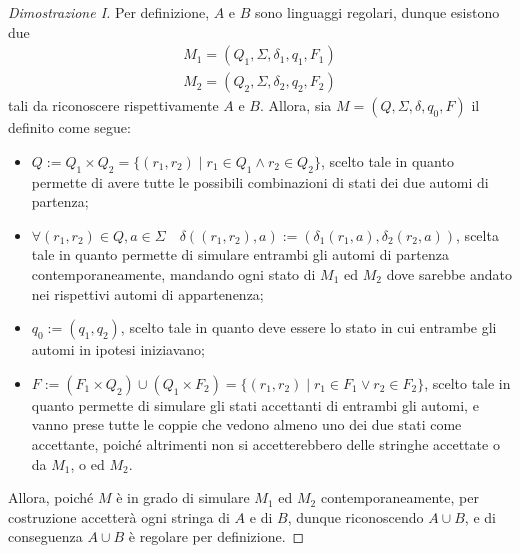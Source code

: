 \documentclass[a4paper, 12pt]{report}
\begin{document}
    \begin{proof}[Dimostrazione I]
        Per definizione, $A$ e $B$ sono linguaggi regolari, dunque esistono due \DFA $$\left. \begin{array}{c}M_1 = (Q_1, \Sigma, \delta_1, q_1, F_1) \\ M_2 = (Q_2, \Sigma, \delta_2, q_2, F_2)\end{array} \right.$$ tali da riconoscere rispettivamente $A$ e $B$. Allora, sia $M = (Q, \Sigma, \delta, q_0, F)$ il \DFA definito come segue:

        \begin{itemize}
            \item $Q := Q_1 \times Q_2 = \{(r_1, r_2) \mid r_1 \in Q_1 \land r_2 \in Q_2\}$, scelto tale in quanto permette di avere tutte le possibili combinazioni di stati dei due automi di partenza;
            \item $\forall (r_1, r_2) \in Q, a \in \Sigma \quad \delta((r_1, r_2), a) := (\delta_1(r_1, a), \delta_2(r_2, a))$, scelta tale in quanto permette di simulare entrambi gli automi di partenza contemporaneamente, mandando ogni stato di $M_1$ ed $M_2$ dove sarebbe andato nei rispettivi automi di appartenenza;
            \item $q_0 := (q_1, q_2)$, scelto tale in quanto deve essere lo stato in cui entrambe gli automi in ipotesi iniziavano;
            \item $F := (F_1 \times Q_2) \cup (Q_1 \times F_2) = \{(r_1, r_2) \mid r_1 \in F_1 \lor r_2 \in F_2\}$, scelto tale in quanto permette di simulare gli stati accettanti di entrambi gli automi, e vanno prese tutte le coppie che vedono almeno uno dei due stati come accettante, poiché altrimenti non si accetterebbero delle stringhe accettate o da $M_1$, o ed $M_2$.
        \end{itemize}

        Allora, poiché $M$ è in grado di simulare $M_1$ ed $M_2$ contemporaneamente, per costruzione accetterà ogni stringa di $A$ e di $B$, dunque riconoscendo $A \cup B$, e di conseguenza $A \cup B$ è regolare per definizione.
    \end{proof}
\end{document}
